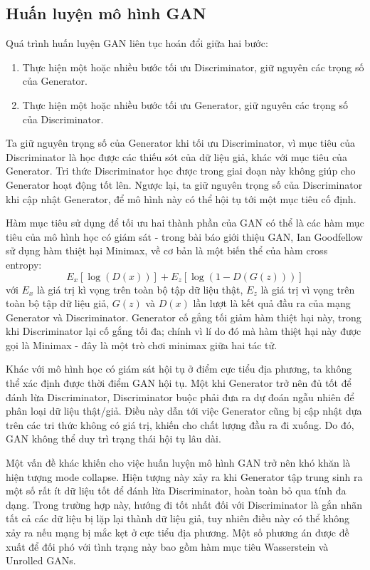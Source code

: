 \documentclass[12pt]{extreport}
\begin{document}
\subsection{Huấn luyện mô hình GAN}
\label{gan}

Quá trình huấn luyện GAN liên tục hoán đổi giữa hai bước:
\begin{enumerate}
    \item Thực hiện một hoặc nhiều bước tối ưu Discriminator, giữ nguyên các trọng số của Generator.
    \item Thực hiện một hoặc nhiều bước tối ưu Generator, giữ nguyên các trọng số của Discriminator.
\end{enumerate}

Ta giữ nguyên trọng số của Generator khi tối ưu Discriminator, vì mục tiêu của Discriminator là học được các thiếu sót của dữ liệu giả, khác với mục tiêu của Generator. Tri thức Discriminator học được trong giai đoạn này không giúp cho Generator hoạt động tốt lên. Ngược lại, ta giữ nguyên trọng số của Discriminator khi cập nhật Generator, để mô hình này có thể hội tụ tới một mục tiêu cố định.

Hàm mục tiêu sử dụng để tối ưu hai thành phần của GAN có thể là các hàm mục tiêu của mô hình học có giám sát - trong bài báo giới thiệu GAN, Ian Goodfellow sử dụng hàm thiệt hại Minimax, về cơ bản là một biến thể của hàm cross entropy:
$$ E_x[\log(D(x))] + E_z[\log(1 - D(G(z)))] $$
với $ E_x $ là giá trị kì vọng trên toàn bộ tập dữ liệu thật, $ E_z $ là giá trị vì vọng trên toàn bộ tập dữ liệu giả, $ G(z) $ và $ D(x) $ lần lượt là kết quả đầu ra của mạng Generator và Discriminator. Generator cố gắng tối giảm hàm thiệt hại này, trong khi Discriminator lại cố gắng tối đa; chính vì lí do đó mà hàm thiệt hại này được gọi là Minimax - đây là một trò chơi minimax giữa hai tác tử.

Khác với mô hình học có giám sát hội tụ ở điểm cực tiểu địa phương, ta không thể xác định được thời điểm GAN hội tụ. Một khi Generator trở nên đủ tốt để đánh lừa Discriminator, Discriminator buộc phải đưa ra dự đoán ngẫu nhiên để phân loại dữ liệu thật/giả. Điều này dẫn tới việc Generator cũng bị cập nhật dựa trên các tri thức không có giá trị, khiến cho chất lượng đầu ra đi xuống. Do đó, GAN không thể duy trì trạng thái hội tụ lâu dài.

Một vấn đề khác khiến cho việc huấn luyện mô hình GAN trở nên khó khăn là hiện tượng mode collapse. Hiện tượng này xảy ra khi Generator tập trung sinh ra một số rất ít dữ liệu tốt để đánh lừa Discriminator, hoàn toàn bỏ qua tính đa dạng. Trong trường hợp này, hướng đi tốt nhất đối với Discriminator là gắn nhãn tất cả các dữ liệu bị lặp lại thành dữ liệu giả, tuy nhiên điều này có thể không xảy ra nếu mạng bị mắc kẹt ở cực tiểu địa phương. Một số phương án được đề xuất để đối phó với tình trạng này bao gồm hàm mục tiêu Wasserstein và Unrolled GANs.
\end{document}
